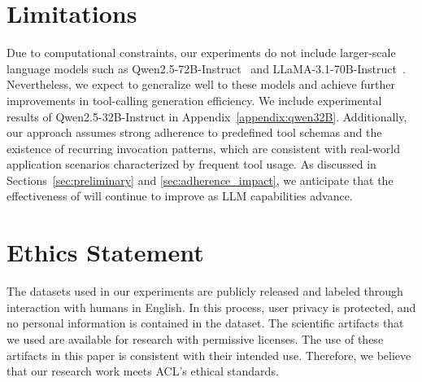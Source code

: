 \section*{Limitations}
\label{sec:limitation} 
Due to computational constraints, our experiments do not include larger-scale language models such as Qwen2.5-72B-Instruct~\citep{Qwen2.5} and LLaMA-3.1-70B-Instruct~\cite{llama3}. Nevertheless, we expect \method to generalize well to these models and achieve further improvements in tool-calling generation efficiency. We include experimental results of Qwen2.5-32B-Instruct in Appendix~\ref{appendix:qwen32B}. Additionally, our approach assumes strong adherence to predefined tool schemas and the existence of recurring invocation patterns, which are consistent with real-world application scenarios characterized by frequent tool usage. As discussed in Sections~\ref{sec:preliminary} and \ref{sec:adherence_impact}, we anticipate that the effectiveness of \method will continue to improve as LLM capabilities advance.

\section*{Ethics Statement}
\label{sec:ethics} 
The datasets used in our experiments are publicly released and labeled through interaction with humans in English. In this process, user privacy is protected, and no personal information is contained in the dataset. The scientific artifacts that we used are available for research with permissive licenses. The use of these artifacts in this paper is consistent with their intended use. Therefore, we believe that our research work meets ACL's ethical standards. 